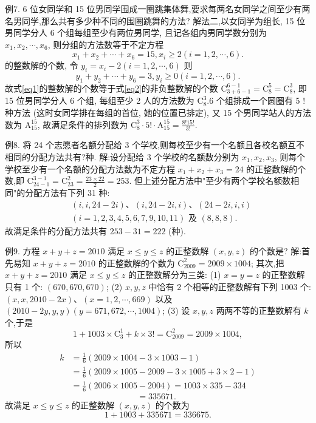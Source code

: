 例7.  6 位女同学和 15 位男同学围成一圈跳集体舞,要求每两名女同学之间至少有两名男同学,那么共有多少种不同的围圈跳舞的方法?
解法二,以女同学为组长, 15 位男同学分人 6 个组每组至少有两位男同学, 且记各组内男同学数分别为 $x_1, x_2, \cdots, x_6$, 则分组的方法数等于不定方程
$$
x_1+x_2+\cdots+x_6=15, x_i \geqslant 2(i=1,2, \cdots, 6). \label{eq1}
$$
的整数解的个数, 令 $y_i=x_i-2(i=1,2, \cdots, 6)$ 则
$$
y_1+y_2+\cdots+y_6=3, y_i \geqslant 0(i=1,2, \cdots, 6) . \label{eq2}
$$
故式\ref{eq1}的整数解的个数等于式\ref{eq2}的非负整数解的个数 $\mathrm{C}_{3+6-1}^{6-1}=\mathrm{C}_8^5=\mathrm{C}_8^3$, 即 15 位男同学分人 6 个组, 每组至少 2 人的方法数为 $\mathrm{C}_8^3 .6$ 个组排成一个圆圈有 5 ! 种方法 (这时女同学排在每组的首位, 她的位置已排定), 又 15 个男同学站人的方法数为 $\mathrm{A}_{15}^{15}$, 故满足条件的排列数为 $\mathrm{C}_8^3 \cdot 5 ! \cdot \mathrm{A}_{15}^{15}=\frac{8 ! 15 !}{3 !}$.



例8. 将 24 个志愿者名额分配给 3 个学校,则每校至少有一个名额且各校名额互不相同的分配方法共有?种.
解:设分配给 3 个学校的名额数分别为 $x_1, x_2, x_3$, 则每个学校至少有一个名额的分配方法数为不定方程 $x_1+x_2+x_3=24$ 的正整数解的个数,即 $\mathrm{C}_{24-1}^{3-1}=\mathrm{C}_{23}^2=\frac{23 \times 22}{2}=253$. 但上述分配方法中"至少有两个学校名额数相同"的分配方法有下列 31 种:
$$
\begin{aligned}
& (i, i, 24-2 i) 、(i, 24-2 i, i) 、(24-2 i, i, i) \\
& (i=1,2,3,4,5,6,7,9,10,11) \text { 及 }(8,8,8) .
\end{aligned}
$$
故满足条件的分配方法共有 $253-31=222$ (种).



例9. 方程 $x+y+z=2010$ 满足 $x \leqslant y \leqslant z$ 的正整数解 $(x, y, z)$ 的个数是? 
解:首先易知 $x+y+z=2010$ 的正整数解的个数为 $\mathrm{C}_{2009}^2=2009 \times 1004$; 其次,把 $x+y+z=2010$ 满足 $x \leqslant y \leqslant z$ 的正整数解分为三类:
(1) $x=y=z$ 的正整数解只有 1 个: $(670,670,670)$;
(2) $x, y, z$ 中恰有 2 个相等的正整数解有下列 1003 个: $(x, x, 2010- 2 x) 、(x=1,2, \cdots, 669)$ 以及 $(2010-2 y, y, y)(y=671,672, \cdots, 1004)$;
(3) 设 $x, y, z$ 两两不等的正整数解有 $k$ 个,于是
$$
1+1003 \times \mathrm{C}_3^1+k \times 3 !=\mathrm{C}_{2009}^2=2009 \times 1004,
$$
所以
$$
\begin{aligned}
k & =\frac{1}{6}(2009 \times 1004-3 \times 1003-1) \\
& =\frac{1}{6}(2009 \times 1005-2009-3 \times 1005+3 \times 2-1) \\
& =\frac{1}{6}(2006 \times 1005-2004)=1003 \times 335-334
\end{aligned}
$$
$$
=335671 \text {. }
$$
故满足 $x \leqslant y \leqslant z$ 的正整数解 $(x, y, z)$ 的个数为
$$
1+1003+335671=336675 .
$$



